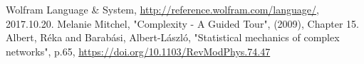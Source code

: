 \documentclass[11pt,a4paper]{article}
\begin{document}
\listoffigures

\begin{thebibliography}{3}
 Wolfram Language \& System, \url{http://reference.wolfram.com/language/}, 2017.10.20.
  Melanie Mitchel, "Complexity - A Guided Tour", (2009), Chapter 15.
Albert, R\'eka and Barab\'asi, Albert-L\'aszl\'o, "Statistical mechanics of complex networks", p.65, \url{https://doi.org/10.1103/RevModPhys.74.47} 
\end{thebibliography}
\end{document}
